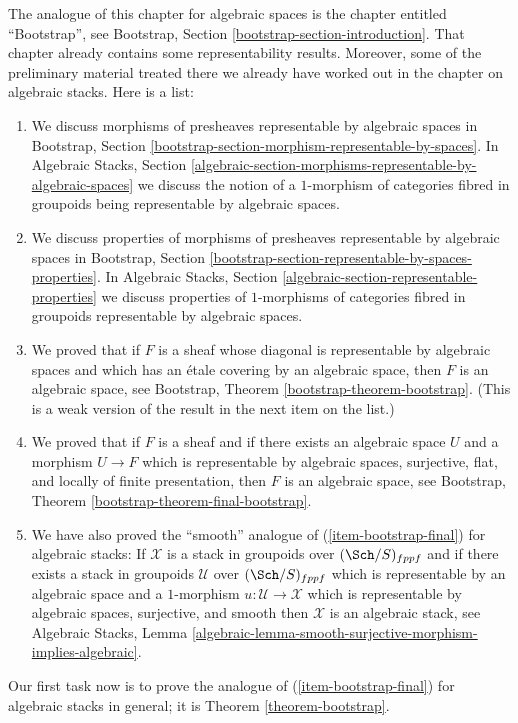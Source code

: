 \noindent
The analogue of this chapter for algebraic spaces is the chapter entitled
``Bootstrap'', see
Bootstrap, Section \ref{bootstrap-section-introduction}.
That chapter already contains some representability results.
Moreover, some of the preliminary material treated there we already
have worked out in the chapter on algebraic stacks.
Here is a list:
\begin{enumerate}
\item We discuss morphisms of presheaves representable by algebraic spaces in
Bootstrap, Section
\ref{bootstrap-section-morphism-representable-by-spaces}.
In
Algebraic Stacks, Section
\ref{algebraic-section-morphisms-representable-by-algebraic-spaces}
we discuss the notion of a $1$-morphism of categories fibred in groupoids
being representable by algebraic spaces.
\item We discuss properties of morphisms of presheaves representable by
algebraic spaces in
Bootstrap, Section
\ref{bootstrap-section-representable-by-spaces-properties}.
In
Algebraic Stacks, Section
\ref{algebraic-section-representable-properties}
we discuss properties of $1$-morphisms of categories fibred in groupoids
representable by algebraic spaces.
\item We proved that if $F$ is a sheaf whose diagonal is representable
by algebraic spaces and which has an \'etale covering by an algebraic
space, then $F$ is an algebraic space, see
Bootstrap, Theorem \ref{bootstrap-theorem-bootstrap}.
(This is a weak version of the result in the next item on the list.)
\item
\label{item-bootstrap-final}
We proved that if $F$ is a sheaf and if there exists an algebraic
space $U$ and a morphism $U \to F$ which is representable by algebraic
spaces, surjective, flat, and locally of finite presentation, then
$F$ is an algebraic space, see
Bootstrap, Theorem \ref{bootstrap-theorem-final-bootstrap}.
\item We have also proved the ``smooth'' analogue of
(\ref{item-bootstrap-final}) for algebraic
stacks: If $\mathcal{X}$ is a stack in groupoids over
$(\Sch/S)_{fppf}$ and if there exists a stack in groupoids
$\mathcal{U}$ over $(\Sch/S)_{fppf}$ which is representable
by an algebraic space and a $1$-morphism $u : \mathcal{U} \to \mathcal{X}$
which is representable by algebraic spaces, surjective, and smooth
then $\mathcal{X}$ is an algebraic stack, see
Algebraic Stacks, Lemma
\ref{algebraic-lemma-smooth-surjective-morphism-implies-algebraic}.
\end{enumerate}
Our first task now is to prove the analogue of
(\ref{item-bootstrap-final}) for algebraic
stacks in general; it is
Theorem \ref{theorem-bootstrap}.




